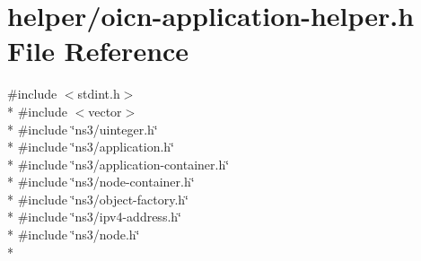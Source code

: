 \hypertarget{oicn-application-helper_8h}{\section{helper/oicn-\/application-\/helper.h File Reference}
\label{oicn-application-helper_8h}
}
{\ttfamily \#include $<$stdint.\-h$>$}\\*
{\ttfamily \#include $<$vector$>$}\\*
{\ttfamily \#include \char`\"{}ns3/uinteger.\-h\char`\"{}}\\*
{\ttfamily \#include \char`\"{}ns3/application.\-h\char`\"{}}\\*
{\ttfamily \#include \char`\"{}ns3/application-\/container.\-h\char`\"{}}\\*
{\ttfamily \#include \char`\"{}ns3/node-\/container.\-h\char`\"{}}\\*
{\ttfamily \#include \char`\"{}ns3/object-\/factory.\-h\char`\"{}}\\*
{\ttfamily \#include \char`\"{}ns3/ipv4-\/address.\-h\char`\"{}}\\*
{\ttfamily \#include \char`\"{}ns3/node.\-h\char`\"{}}\\*
